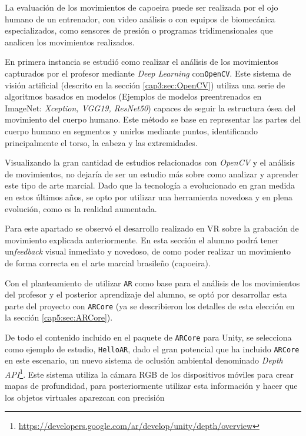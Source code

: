 La evaluación de los movimientos de capoeira puede ser realizada por el ojo humano de un entrenador, con video análisis o con equipos de biomecánica especializados, como sensores de presión o programas tridimensionales que analicen los movimientos realizados. 

En primera instancia se estudió como realizar el análisis de los movimientos capturados por el profesor mediante \textit{Deep Learning} con\texttt{OpenCV}. Este sistema de visión artificial (descrito en la sección \ref{cap3:sec:OpenCV}) utiliza una serie de algoritmos basados en modelos (Ejemplos de modelos preentrenados en ImageNet: \textit{Xception, VGG19, ResNet50}) capaces de seguir la estructura ósea del movimiento del cuerpo humano. Este método se base en representar las partes del cuerpo humano en segmentos y unirlos mediante puntos, identificando principalmente el torso, la cabeza y las extremidades.

Visualizando la gran cantidad de estudios relacionados con \textit{OpenCV} y el análisis de movimientos, no dejaría de ser un estudio más sobre como analizar y aprender este tipo de arte marcial. Dado que la tecnología a evolucionado en gran medida en estos últimos años, se opto por utilizar una herramienta novedosa y en plena evolución, como es la realidad aumentada.

Para este apartado se observó el desarrollo realizado en VR sobre la grabación de movimiento explicada anteriormente. En esta sección el alumno podrá tener un\textit{feedback} visual inmediato y novedoso, de como poder realizar un movimiento de forma correcta en el arte marcial brasileño (capoeira).

Con el planteamiento de utilizar \texttt{AR} como base para el análisis de los movimientos del profesor y el posterior aprendizaje del alumno, se optó por desarrollar esta parte del proyecto con \texttt{ARCore} (ya se describieron los detalles de esta elección en la sección \ref{cap5:sec:ARCore}).

De todo el contenido incluido en el paquete de \texttt{ARCore} para Unity, se selecciona como ejemplo de estudio, \texttt{HelloAR}, dado el gran potencial que ha incluido \texttt{ARCore} en este escenario, un nuevo sistema de oclusión ambiental denominado \textit{Depth API}\footnote{\url{https://developers.google.com/ar/develop/unity/depth/overview}}. Este sistema utiliza la cámara RGB de los dispositivos móviles para crear mapas de profundidad, para posteriormente utilizar esta información y hacer que los objetos virtuales aparezcan con precisión 

